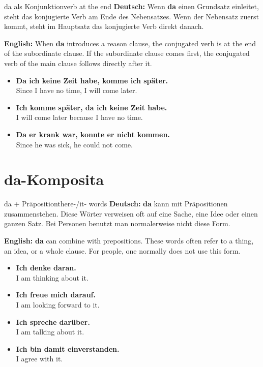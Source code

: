 \documentclass[a4paper,11pt]{article}
\newcommand{\GermanText}[1]{\textbf{Deutsch: }#1\par}
\newcommand{\EnglishText}[1]{{\small\color{SoftGray}\textbf{English: }#1\par}}
\newcommand{\ExampleItem}[2]{\item \textbf{#1}\\{\small\color{SoftGray}#2}}
\begin{document}
\begin{grammarentry}{da als Konjunktion}{verb at the end}
\GermanText{Wenn \textbf{da} einen Grundsatz einleitet, steht das konjugierte Verb am Ende des Nebensatzes. Wenn der Nebensatz zuerst kommt, steht im Hauptsatz das konjugierte Verb direkt danach.}
\EnglishText{When \textbf{da} introduces a reason clause, the conjugated verb is at the end of the subordinate clause. If the subordinate clause comes first, the conjugated verb of the main clause follows directly after it.}

\begin{exbox}
\begin{itemize}
    \ExampleItem{Da ich keine Zeit habe, komme ich später.}{Since I have no time, I will come later.}
    \ExampleItem{Ich komme später, da ich keine Zeit habe.}{I will come later because I have no time.}
    \ExampleItem{Da er krank war, konnte er nicht kommen.}{Since he was sick, he could not come.}
\end{itemize}
\end{exbox}
\end{grammarentry}

\section{da-Komposita}

\begin{grammarentry}{da + Präposition}{there-/it- words}
\GermanText{\textbf{da} kann mit Präpositionen zusammenstehen. Diese Wörter verweisen oft auf eine Sache, eine Idee oder einen ganzen Satz. Bei Personen benutzt man normalerweise nicht diese Form.}
\EnglishText{\textbf{da} can combine with prepositions. These words often refer to a thing, an idea, or a whole clause. For people, one normally does not use this form.}

\begin{exbox}
\begin{itemize}
    \ExampleItem{Ich denke daran.}{I am thinking about it.}
    \ExampleItem{Ich freue mich darauf.}{I am looking forward to it.}
    \ExampleItem{Ich spreche darüber.}{I am talking about it.}
    \ExampleItem{Ich bin damit einverstanden.}{I agree with it.}
\end{itemize}
\end{exbox}
\end{grammarentry}
\end{document}
